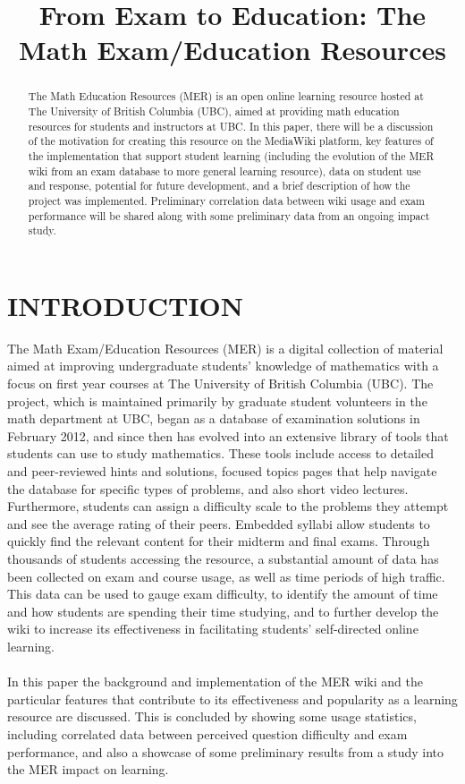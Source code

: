 \documentclass{primus}
\title{From Exam to Education: The Math Exam/Education Resources
}
\begin{document}
\makePtitle

\begin{abstract}
The Math Education Resources (MER) is an open online learning resource hosted at The University of British Columbia (UBC), aimed at providing math education resources for students and instructors at UBC. In this paper, there will be a discussion of the motivation for creating this resource on the MediaWiki platform, key features of the implementation that support student learning (including the evolution of the MER wiki from an exam database to more general learning resource), data on student use and response, potential for future development, and a brief description of how the project was implemented.  Preliminary correlation data between wiki usage and exam performance will be shared along with some preliminary data from an ongoing impact study.
\end{abstract}

\listkeywords

\section{INTRODUCTION}\label{sec:Introduction}

The Math Exam/Education Resources (MER) is a digital collection of material aimed at improving undergraduate students’ knowledge of mathematics with a focus on first year courses at The University of British Columbia (UBC). The project, which is maintained primarily by graduate student volunteers in the math department at UBC, began as a database of examination solutions in February 2012, and since then has evolved into an extensive library of tools that students can use to study mathematics. These tools include access to detailed and peer-reviewed hints and solutions, focused topics pages that help navigate the database for specific types of problems, and also short video lectures. Furthermore, students can assign a difficulty scale to the problems they attempt and see the average rating of their peers. Embedded syllabi allow students to quickly find the relevant content for their midterm and final exams. Through thousands of students accessing the resource, a substantial amount of data has been collected on exam and course usage, as well as time periods of high traffic. This data can be used to gauge exam difficulty, to identify the amount of time and how students are spending their time studying, and to further develop the wiki to increase its effectiveness in facilitating students’ self-directed online learning.
\\\\
\noindent{}In this paper the background and implementation of the MER wiki and the particular features that contribute to its effectiveness and popularity as a learning resource are discussed. This is concluded by showing some usage statistics, including correlated data between perceived question difficulty and exam performance, and also a showcase of some preliminary results from a  study into the MER impact on learning.
\end{document}
